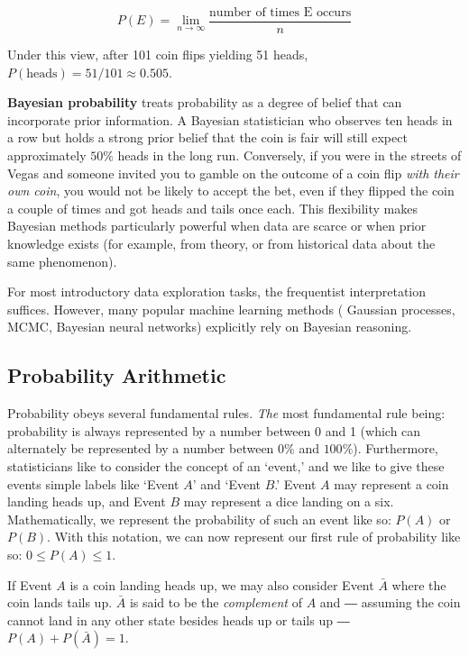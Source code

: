 \begin{equation}
    P(E) = \lim_{n \to \infty} \frac{\text{number of times E occurs}}{n}
\end{equation}

\noindent Under this view, after 101 coin flips yielding 51 heads, $P(\text{heads}) = 51/101 \approx 0.505$.

\textbf{Bayesian probability} treats probability as a degree of belief that can incorporate prior information. A Bayesian statistician who observes ten heads in a row but holds a strong prior belief that the coin is fair will still expect approximately $50\%$ heads in the long run. Conversely, if you were in the streets of Vegas and someone invited you to gamble on the outcome of a coin flip \textit{with their own coin}, you would not be likely to accept the bet, even if they flipped the coin a couple of times and got heads and tails once each. This flexibility makes Bayesian methods particularly powerful when data are scarce or when prior knowledge exists (for example, from theory, or from historical data about the same phenomenon).

For most introductory data exploration tasks, the frequentist interpretation suffices. However, many popular machine learning methods (\eg{} Gaussian processes, MCMC, Bayesian neural networks) explicitly rely on Bayesian reasoning.

\subsection*{Probability Arithmetic}
Probability obeys several fundamental rules. \textit{The} most fundamental rule being: probability is always represented by a number between 0 and 1 (which can alternately be represented by a number between $0\%$ and $100\%$). Furthermore, statisticians like to consider the concept of an `event,' and we like to give these events simple labels like `Event $A$' and `Event $B$.' Event $A$ may represent a coin landing heads up, and Event $B$ may represent a dice landing on a six. Mathematically, we represent the probability of such an event like so: $P(A)$ or $P(B)$. With this notation, we can now represent our first rule of probability like so: $0 \leq P(A) \leq 1$.

If Event $A$ is a coin landing heads up, we may also consider Event $\bar{A}$ where the coin lands tails up. $\bar{A}$ is said to be the \textit{complement} of $A$ and ― assuming the coin cannot land in any other state besides heads up or tails up ― $P(A) + P(\bar{A}) = 1$.

